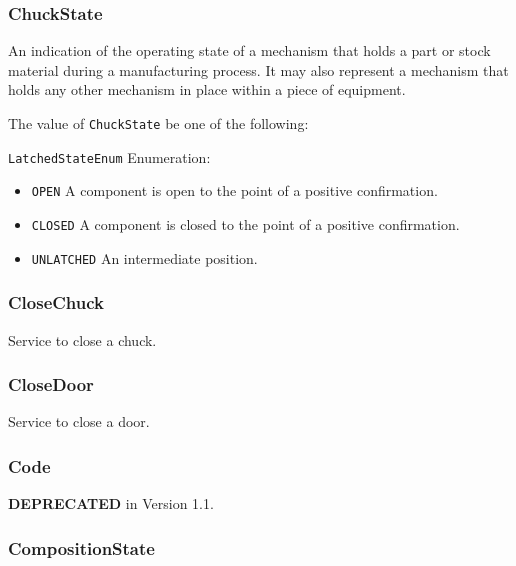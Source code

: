 \subsubsection{ChuckState}
\label{sec:ChuckState}



An indication of the operating state of a mechanism that holds a part or stock material during a manufacturing process. It may also represent a mechanism that holds any other mechanism in place within a piece of equipment.


The value of \texttt{ChuckState} \MUST be one of the following: 


\texttt{LatchedStateEnum} Enumeration:

\begin{itemize}
\item \texttt{OPEN} \newline A component is open to the point of a positive confirmation. 
\item \texttt{CLOSED} \newline A component is closed to the point of a positive confirmation. 
\item \texttt{UNLATCHED} \newline An intermediate position. 
\end{itemize}

\FloatBarrier

\subsubsection{CloseChuck}
\label{sec:CloseChuck}



Service to close a chuck.


\subsubsection{CloseDoor}
\label{sec:CloseDoor}



Service to close a door.


\subsubsection{Code}
\label{sec:Code}



\textbf{DEPRECATED} in Version 1.1.


\subsubsection{CompositionState}
\label{sec:CompositionState}



